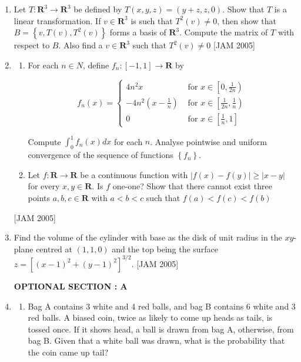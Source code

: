\begin{enumerate}
\begin{enumerate}
\end{enumerate}
 \hfill [JAM 2005]

 

\item  Let $T: \boldsymbol{R}^{3} \longrightarrow \boldsymbol{R}^{3}$ be defined by $T(x, y, z)=(y+z, z, 0)$. Show that $T$ is a linear transformation. If $v \in \boldsymbol{R}^{3}$ is such that $T^{2}(v) \neq 0$, then show that $B=\left\{v, T(v), T^{2}(v)\right\}$ forms a basis of $\boldsymbol{R}^{3}$. Compute the matrix of $T$ with respect to $B$. Also find a $v \in \boldsymbol{R}^{3}$ such that $T^{2}(v) \neq 0$ 
 \hfill [JAM 2005]

\item 
\begin{enumerate}
    \item For each $n \in N$, define $f_{n}:[-1,1] \longrightarrow \boldsymbol{R}$ by

    $$
        f_{n}(x)= \begin{cases}4 n^{2} x & \text { for } x \in\left[0, \frac{1}{2 n}\right) \\ -4 n^{2}\left(x-\frac{1}{n}\right) & \text { for } x \in\left[\frac{1}{2 n}, \frac{1}{n}\right) \\ 0 & \text { for } x \in\left[\frac{1}{n}, 1\right]\end{cases}
    $$

    Compute $\int_{0}^{1} f_{n}(x) d x$ for each $n$. Analyse pointwise and uniform convergence of the sequence of functions $\left\{f_{n}\right\}$.
    

    \item Let $f: \boldsymbol{R} \longrightarrow \boldsymbol{R}$ be a continuous function with $|f(x)-f(y)| \geq|x-y|$ for every $x, y \in \boldsymbol{R}$. Is $f$ one-one? Show that there cannot exist three points $a, b, c \in \boldsymbol{R}$ with $a<b<c$ such that $f(a)<f(c)<f(b)$ 
\end{enumerate}
 \hfill [JAM 2005]

 
\item Find the volume of the cylinder with base as the disk of unit radius in the $x y$-plane centred at $(1,1,0)$ and the top being the surface $z=\left[(x-1)^{2}+(y-1)^{2}\right]^{3 / 2}$. 
 \hfill [JAM 2005]


 
\begin{center}
\textbf{OPTIONAL SECTION : A}
\end{center}

\item 
\begin{enumerate}
    \item Bag A contains 3 white and 4 red balls, and bag B contains 6 white and 3 red balls. A biased coin, twice as likely to come up heads as tails, is tossed once. If it shows head, a ball is drawn from bag A, otherwise, from bag B. Given that a white ball was drawn, what is the probability that the coin came up tail?


\end{enumerate}
\end{enumerate}
